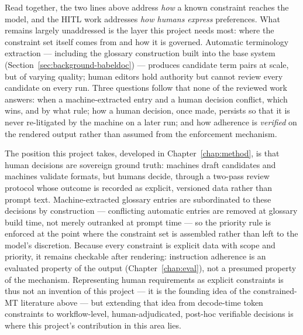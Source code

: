 Read together, the two lines above address \emph{how} a known
constraint reaches the model, and the HITL work addresses \emph{how
humans express} preferences. What remains largely unaddressed is the
layer this project needs most: where the constraint set itself comes
from and how it is governed. Automatic terminology extraction ---
including the glossary construction built into the base system
(Section~\ref{sec:background-babeldoc}) --- produces candidate term pairs at
scale, but of varying quality; human editors hold authority but cannot
review every candidate on every run. Three questions follow that none
of the reviewed work answers: when a machine-extracted entry and a
human decision conflict, which wins, and by what rule; how a human
decision, once made, persists so that it is never re-litigated by the
machine on a later run; and how adherence is \emph{verified} on the
rendered output rather than assumed from the enforcement mechanism.

The position this project takes, developed in
Chapter~\ref{chap:method}, is that human decisions are sovereign
ground truth: machines draft candidates and machines validate
formats, but humans decide, through a two-pass review protocol whose
outcome is recorded as explicit, versioned data rather than prompt
text. Machine-extracted glossary entries are subordinated to these
decisions by construction --- conflicting automatic entries are
removed at glossary build time, not merely outranked at prompt time
--- so the priority rule is enforced at the point where the constraint
set is assembled rather than left to the model's discretion.
Because every constraint is explicit data with scope and priority, it
remains checkable after rendering: instruction adherence is an
evaluated property of the output (Chapter~\ref{chap:eval}), not a
presumed property of the mechanism. Representing human requirements as
explicit constraints is thus not an invention of this project --- it
is the founding idea of the constrained-MT literature above --- but
extending that idea from decode-time token constraints to
workflow-level, human-adjudicated, post-hoc verifiable decisions is
where this project's contribution in this area lies.

